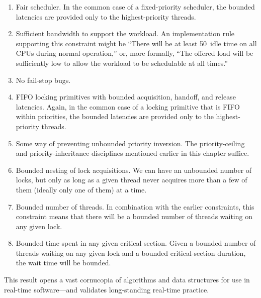 \begin{enumerate}
\item	Fair scheduler.
	In the common case of a fixed-priority scheduler, the bounded
	latencies are provided only to the highest-priority threads.
\item	Sufficient bandwidth to support the workload.
	An implementation rule supporting this constraint might be
	``There will be at least 50\pct\ idle time on all CPUs
	during normal operation,''
	or, more formally, ``The offered load will be sufficiently low
	to allow the workload to be schedulable at all times.''
\item	No fail-stop bugs.
\item	FIFO locking primitives with bounded acquisition, handoff,
	and release latencies.
	Again, in the common case of a locking primitive that is FIFO
	within priorities, the bounded latencies are provided only
	to the highest-priority threads.
\item	Some way of preventing unbounded priority inversion.
	The priority-ceiling and priority-inheritance disciplines
	mentioned earlier in this chapter suffice.
\item	Bounded nesting of lock acquisitions.
	We can have an unbounded number of locks, but only as long as a
	given thread never acquires more than a few of them (ideally only
	one of them) at a time.
\item	Bounded number of threads.
	In combination with the earlier constraints, this constraint means
	that there will be a bounded number of threads waiting on any
	given lock.
\item	Bounded time spent in any given critical section.
	Given a bounded number of threads waiting on any given lock and
	a bounded critical-section duration, the wait time will be bounded.
\end{enumerate}

\QuickQuizEnd

This result opens a vast cornucopia of algorithms and data structures
for use in real-time software---and validates long-standing real-time practice.

